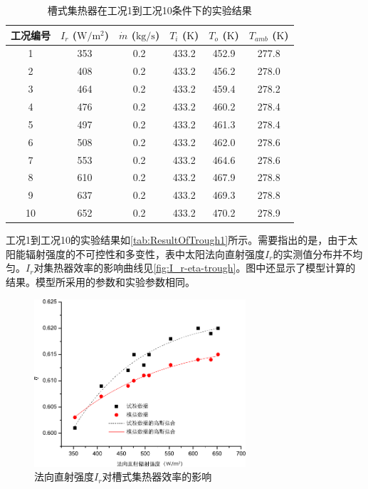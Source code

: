 \begin{table}[htbp]
	\caption{槽式集热器在工况1到工况10条件下的实验结果}
	\centering
	\begin{tabular}{cccccc}
		\toprule
		工况编号	& $I_r$ ($\mathrm{W/m^2}$)	&	$\dot{m}$ ($\mathrm{kg/s}$)			&	$T_i$ ($\mathrm{K}$)	&	$T_o$ ($\mathrm{K}$)		&	$T_{amb}$ ($\mathrm{K}$)\\
		\midrule
		1	&	353	&	0.2	&	433.2	&	452.9	&	277.8\\
		2	&	408	&	0.2	&	433.2	&	456.2	&	278.0\\
		3	&	464	&	0.2	&	433.2	&	459.4	&	278.2\\
		4	&	476	&	0.2	&	433.2	&	460.2	&	278.4\\
		5	&	497	&	0.2	&	433.2	&	461.3	&	278.4\\
		6	&	508	&	0.2	&	433.2	&	462.0	&	278.6\\
		7	&	553	&	0.2	&	433.2	&	464.6	&	278.6\\
		8	&	610	&	0.2	&	433.2	&	467.9	&	278.8\\
		9	&	637	&	0.2	&	433.2	&	469.3	&	278.8\\
		10	&	652	&	0.2	&	433.2	&	470.2	&	278.9\\
		\bottomrule
	\end{tabular}
	\label{tab:ResultOfTrough1}
\end{table}
工况1到工况10的实验结果如\autoref{tab:ResultOfTrough1}所示。需要指出的是，由于太阳能辐射强度的不可控性和多变性，表中太阳法向直射强度$I_r$的实测值分布并不均匀。$I_r$对集热器效率的影响曲线见\autoref{fig:I_r-eta-trough}。图中还显示了模型计算的结果。模型所采用的参数和实验参数相同。
\begin{figure}[!ht]
\centering
\includegraphics[width=0.7\textwidth]{fig/I_r-eta-trough}
\caption{法向直射强度$I_r$对槽式集热器效率的影响}
\label{fig:I_r-eta-trough}
\end{figure}

